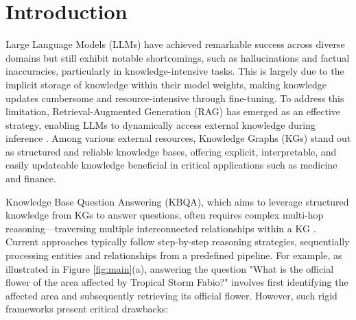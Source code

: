 \documentclass[10pt,conference]{IEEEtran}
\begin{document}
\section{Introduction}
Large Language Models (LLMs) have achieved remarkable success across diverse domains but still exhibit notable shortcomings, such as hallucinations and factual inaccuracies, particularly in knowledge-intensive tasks. This is largely due to the implicit storage of knowledge within their model weights, making knowledge updates cumbersome and resource-intensive through fine-tuning. To address this limitation, Retrieval-Augmented Generation (RAG) has emerged as an effective strategy, enabling LLMs to dynamically access external knowledge during inference \cite{wang2025plugging}. Among various external resources, Knowledge Graphs (KGs) stand out as structured and reliable knowledge bases, offering explicit, interpretable, and easily updateable knowledge beneficial in critical applications such as medicine and finance.

Knowledge Base Question Answering (KBQA), which aims to leverage structured knowledge from KGs to answer questions, often requires complex multi-hop reasoning—traversing multiple interconnected relationships within a KG \cite{wang-yu-2025-iquest}. Current approaches typically follow step-by-step reasoning strategies, sequentially processing entities and relationships from a predefined pipeline. For example, as illustrated in Figure \ref{fig:main}(a), answering the question "What is the official flower of the area affected by Tropical Storm Fabio?" involves first identifying the affected area and subsequently retrieving its official flower. However, such rigid frameworks present critical drawbacks:
\end{document}
